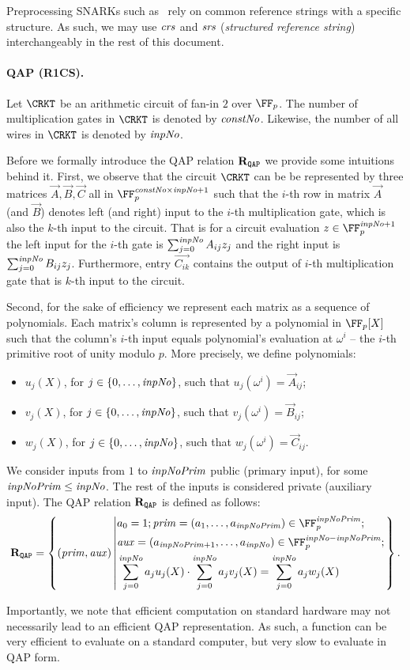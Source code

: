 \begin{remark}
  Preprocessing SNARKs such as~\cite{groth2016size} rely on common reference strings with a specific structure. As such, we may use $\mathit{crs}$ and $\mathit{srs}$ (\emph{structured reference string}) interchangeably in the rest of this document.
\end{remark}

\paragraph{QAP (R1CS).}
Let $\CRKT$ be an arithmetic circuit of fan-in $2$ over $\FFx{p}$.
The number of multiplication gates in $\CRKT$ is denoted by $\mathit{constNo}$. Likewise, the number of all wires in $\CRKT$ is denoted by $\mathit{inpNo}$.

Before we formally introduce the QAP relation $\mathbf{R}_{\texttt{QAP}}$ we provide some intuitions behind it.
First, we observe that the circuit $\CRKT$ can be be represented by three matrices $\vec{A}, \vec{B}, \vec{C}$ all in $\FFx{p}^{\constno \times \inpno + 1}$ such that
the $i$-th row in matrix $\vec{A}$ (and $\vec{B}$) denotes left (and right) input to the $i$-th multiplication gate, which is also the $k$-th input to the circuit. That is for a circuit evaluation $z \in \FFx{p}^{\inpno + 1}$ the left input for the $i$-th gate is $\sum_{j = 0}^{\mathit{inpNo}} A_{i j} z_{j}$ and the right input is $\sum_{j = 0}^{\mathit{inpNo}} B_{i j} z_{j}$.
Furthermore, entry $\vec{C_{i k}}$ contains the output of $i$-th multiplication gate that is $k$-th input to the circuit.

Second, for the sake of efficiency we represent each matrix as a sequence of polynomials. Each matrix's column is represented by a polynomial in $\FFx{p}[X]$ such that the column's $i$-th input equals polynomial's evaluation at $\omega^{i}$ -- the $i$-th primitive root of unity modulo $p$. More precisely, we define polynomials:
\begin{itemize}
  \item $u_j (X)$, for $j \in \{{0},\ldots,{\mathit{inpNo}}\}$, such that $u_j (\omega^{i}) = \vec{A}_{i j}$;
  \item $v_j (X)$, for $j \in \{{0},\ldots,{\mathit{inpNo}}\}$, such that $v_j (\omega^{i}) = \vec{B}_{i j}$;
  \item $w_j (X)$, for $j \in \{{0},\ldots,{\mathit{inpNo}}\}$, such that $w_j (\omega^{i}) = \vec{C}_{i j}$.
\end{itemize}

We consider inputs from $1$ to $\mathit{inpNoPrim}$ public (primary input), for some $\mathit{inpNoPrim} \leq \mathit{inpNo}$. The rest of the inputs is considered private (auxiliary input). The QAP relation $\mathbf{R}_{\texttt{QAP}}$ is defined as follows:
\[
\RELQAP = \left\{ (\priminputs, \auxinputs) \left\vert
    \begin{aligned}
    & a_0 = 1; \priminputs = (a_1, \ldots, a_\inpnoprim) \in \FFx{p}^{\inpnoprim};\\
    &\auxinputs = (a_{\inpnoprim + 1}, \ldots, a_{\inpno}) \in \FFx{p}^{\inpno - \inpnoprim};\\
    & \sum_{j = 0}^{\inpno} a_j u_j (X) \cdot \sum_{j = 0}^{\inpno} a_j v_j (X) =
    \sum_{j = 0}^{\inpno} a_j w_j (X)
    \end{aligned}
    \right.
\right\}.
\]

\begin{notebox}
    Importantly, we note that efficient computation on standard hardware may not necessarily lead to an efficient QAP representation. As such, a function can be very efficient to evaluate on a standard computer, but very slow to evaluate in QAP form.
\end{notebox}
